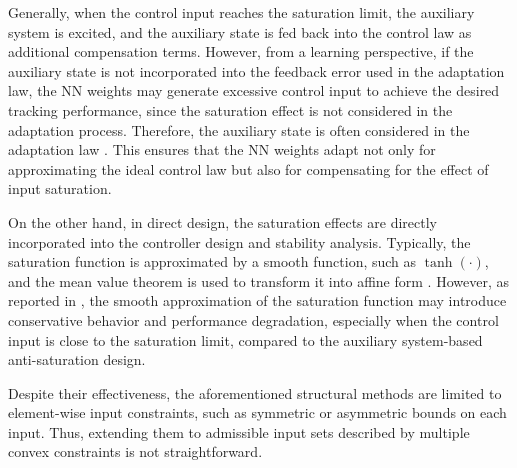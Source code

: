\documentclass[letterpaper, journal]{IEEEtran}
\begin{document}
Generally, when the control input reaches the saturation limit, the auxiliary system is excited, and the auxiliary state is fed back into the control law as additional compensation terms.
However, from a learning perspective, if the auxiliary state is not incorporated into the feedback error used in the adaptation law, the NN weights may generate excessive control input to achieve the desired tracking performance, since the saturation effect is not considered in the adaptation process.
Therefore, the auxiliary state is often considered in the adaptation law \cite{Gao:2017aa,Esfandiari:2014aa,Esfandiari:2015aa,Liu:2024aa,Liu:2025aa,Yu:2022aa,Rezaei:2025aa}.
This ensures that the NN weights adapt not only for approximating the ideal control law but also for compensating for the effect of input saturation.

On the other hand, in direct design, the saturation effects are directly incorporated into the controller design and stability analysis.
Typically, the saturation function is approximated by a smooth function, such as $\tanh(\cdot)$, and the mean value theorem is used to transform it into affine form \cite{Wang:2013aa,Cui:2014aa,Li:2024aa}.
However, as reported in \cite{Min:2021aa}, the smooth approximation of the saturation function may introduce conservative behavior and performance degradation, especially when the control input is close to the saturation limit, compared to the auxiliary system-based anti-saturation design.

Despite their effectiveness, the aforementioned structural methods are limited to element-wise input constraints, such as symmetric or asymmetric bounds on each input.
Thus, extending them to admissible input sets described by multiple convex constraints is not straightforward.


\end{document}
